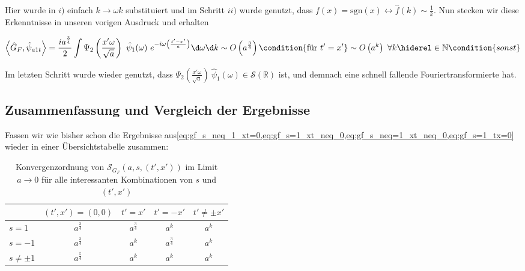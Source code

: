 Hier wurde in $i)$ einfach $k \rightarrow \omega k$ substituiert und im Schritt $ii)$
wurde genutzt, dass $f(x) = \mathrm{sgn}(x) \leftrightarrow \hat f(k) \sim \frac{1}{k}$.
Nun stecken wir diese Erkenntnisse in unseren vorigen Ausdruck und erhalten

\begin{dmath}
 \left\langle \hat G_F, \hat\psi_{a1t} \right\rangle
    =
    \frac{i a^{\frac{3}{4}}}{2} \int \Psi_2\left(\frac{x' \omega}{\sqrt{a}}\right)
    ~\hat \psi_1(\omega)
    ~ e^{-i \omega \left(\frac{t'-x'}{a}\right)}
    \d \omega \d k
    \sim O\left(a^{\frac{3}{4}}\right)  \condition{\textrm{für } t'=x'}
    \sim O\left(a^k\right) ~ \forall k \hiderel \in \mathbb{N} \condition{sonst}
    \label{eq:gf_s=1_xt_neq_0}
\end{dmath}

Im letzten Schritt wurde wieder genutzt, dass
$\Psi_2\left(\frac{x' \omega}{\sqrt{a}}\right) ~\hat \psi_1(\omega) \in \mathcal{S}(\mathbb{R})$
ist, und demnach eine schnell fallende Fouriertransformierte hat.

\subsection{Zusammenfassung und Vergleich der Ergebnisse}
Fassen wir wie bisher schon die Ergebnisse aus\cref{eq:gf_s_neq_1_xt=0,eq:gf_s=1_xt_neq_0,eq:gf_s_neq=1_xt_neq_0,eq:gf_s=1_tx=0} wieder in einer Übersichtstabelle zusammen:


\begin{table}[]
\centering
\begin{tabular}{l|cccc}
        & \multicolumn{1}{l}{$(t', x') = (0, 0)$} & \multicolumn{1}{l}{$t' = x'$} & \multicolumn{1}{l}{$t' = -x'$} & \multicolumn{1}{l}{$t' \neq \pm x'$} \\ \hline
$s=1$   & $a^{\frac{3}{4}}$                       & $a^{\frac{3}{4}}$             & $a^k$                          & $a^k$                                \\
$s=-1$  &$a^{\frac{3}{4}}$                       & $a^k$                         & $a^{\frac{3}{4}}$              & $a^k$                                \\
$s \neq \pm 1$ & $a^{\frac{5}{4}}$                       & $a^k$                         & $a^k$                          & $a^k$                                \\
\end{tabular}
\caption{Konvergenzordnung von $\mathcal{S}_{G_F}(a,s,(t',x'))$ im Limit $a \to 0$ für alle interessanten Kombinationen von $s$ und $(t',x')$}
\label{tab:wavefrontset_gf}
\end{table}




